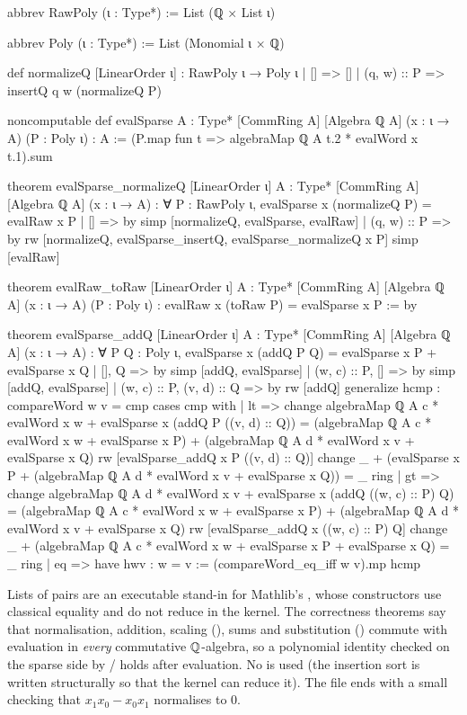\begin{leancode}
abbrev RawPoly (ι : Type*) := List (ℚ × List ι)

abbrev Poly (ι : Type*) := List (Monomial ι × ℚ)

def normalizeQ [LinearOrder ι] : RawPoly ι → Poly ι
  | [] => []
  | (q, w) :: P => insertQ q w (normalizeQ P)

noncomputable def evalSparse {A : Type*} [CommRing A] [Algebra ℚ A]
    (x : ι → A) (P : Poly ι) : A :=
  (P.map fun t => algebraMap ℚ A t.2 * evalWord x t.1).sum

theorem evalSparse_normalizeQ [LinearOrder ι]
    {A : Type*} [CommRing A] [Algebra ℚ A] (x : ι → A) :
    ∀ P : RawPoly ι, evalSparse x (normalizeQ P) = evalRaw x P
  | [] => by simp [normalizeQ, evalSparse, evalRaw]
  | (q, w) :: P => by
      rw [normalizeQ, evalSparse_insertQ, evalSparse_normalizeQ x P]
      simp [evalRaw]

theorem evalRaw_toRaw [LinearOrder ι]
    {A : Type*} [CommRing A] [Algebra ℚ A] (x : ι → A) (P : Poly ι) :
    evalRaw x (toRaw P) = evalSparse x P := by

theorem evalSparse_addQ [LinearOrder ι]
    {A : Type*} [CommRing A] [Algebra ℚ A] (x : ι → A) :
    ∀ P Q : Poly ι,
      evalSparse x (addQ P Q) = evalSparse x P + evalSparse x Q
  | [], Q => by simp [addQ, evalSparse]
  | (w, c) :: P, [] => by simp [addQ, evalSparse]
  | (w, c) :: P, (v, d) :: Q => by
      rw [addQ]
      generalize hcmp : compareWord w v = cmp
      cases cmp with
      | lt =>
          change algebraMap ℚ A c * evalWord x w +
              evalSparse x (addQ P ((v, d) :: Q)) =
            (algebraMap ℚ A c * evalWord x w + evalSparse x P) +
              (algebraMap ℚ A d * evalWord x v + evalSparse x Q)
          rw [evalSparse_addQ x P ((v, d) :: Q)]
          change _ + (evalSparse x P +
            (algebraMap ℚ A d * evalWord x v + evalSparse x Q)) = _
          ring
      | gt =>
          change algebraMap ℚ A d * evalWord x v +
              evalSparse x (addQ ((w, c) :: P) Q) =
            (algebraMap ℚ A c * evalWord x w + evalSparse x P) +
              (algebraMap ℚ A d * evalWord x v + evalSparse x Q)
          rw [evalSparse_addQ x ((w, c) :: P) Q]
          change _ + (algebraMap ℚ A c * evalWord x w + evalSparse x P +
            evalSparse x Q) = _
          ring
      | eq =>
          have hwv : w = v := (compareWord_eq_iff w v).mp hcmp
\end{leancode}

\begin{dictionary}
Lists of pairs are an executable stand-in for Mathlib's , whose constructors use classical
equality and do not reduce in the kernel. The correctness theorems say that normalisation, addition, scaling
(), sums and substitution () commute with evaluation in \emph{every}
commutative ${\mathbb{Q}}$-algebra, so a polynomial identity checked on the sparse side by / holds
after evaluation. No  is used (the insertion sort is written structurally so that the kernel can
reduce it). The file ends with a small  checking that $x_1x_0 - x_0x_1$ normalises to $0$.
\end{dictionary}

